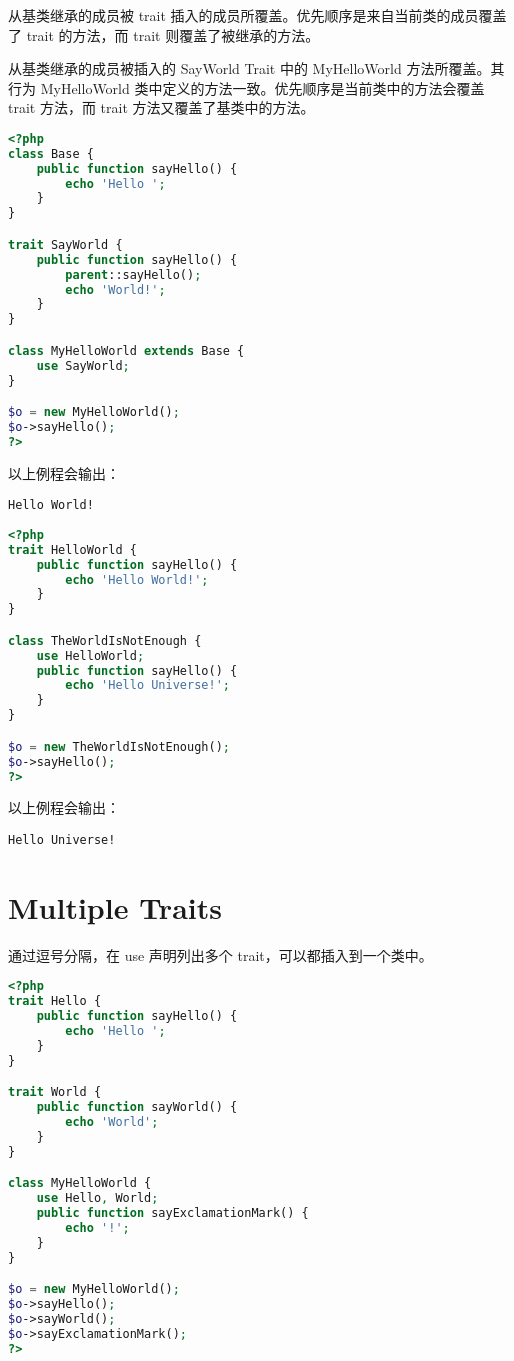 从基类继承的成员被 trait 插入的成员所覆盖。优先顺序是来自当前类的成员覆盖了 trait 的方法，而 trait 则覆盖了被继承的方法。

从基类继承的成员被插入的 SayWorld Trait 中的 MyHelloWorld 方法所覆盖。其行为 MyHelloWorld 类中定义的方法一致。优先顺序是当前类中的方法会覆盖 trait 方法，而 trait 方法又覆盖了基类中的方法。

\begin{lstlisting}[language=PHP]
<?php
class Base {
    public function sayHello() {
        echo 'Hello ';
    }
}

trait SayWorld {
    public function sayHello() {
        parent::sayHello();
        echo 'World!';
    }
}

class MyHelloWorld extends Base {
    use SayWorld;
}

$o = new MyHelloWorld();
$o->sayHello();
?>
\end{lstlisting}


以上例程会输出：

\begin{verbatim}
Hello World!
\end{verbatim}

\begin{lstlisting}[language=PHP]
<?php
trait HelloWorld {
    public function sayHello() {
        echo 'Hello World!';
    }
}

class TheWorldIsNotEnough {
    use HelloWorld;
    public function sayHello() {
        echo 'Hello Universe!';
    }
}

$o = new TheWorldIsNotEnough();
$o->sayHello();
?>
\end{lstlisting}


以上例程会输出：

\begin{verbatim}
Hello Universe!
\end{verbatim}

\section{Multiple Traits}


通过逗号分隔，在 use 声明列出多个 trait，可以都插入到一个类中。

\begin{lstlisting}[language=PHP]
<?php
trait Hello {
    public function sayHello() {
        echo 'Hello ';
    }
}

trait World {
    public function sayWorld() {
        echo 'World';
    }
}

class MyHelloWorld {
    use Hello, World;
    public function sayExclamationMark() {
        echo '!';
    }
}

$o = new MyHelloWorld();
$o->sayHello();
$o->sayWorld();
$o->sayExclamationMark();
?>
\end{lstlisting}

